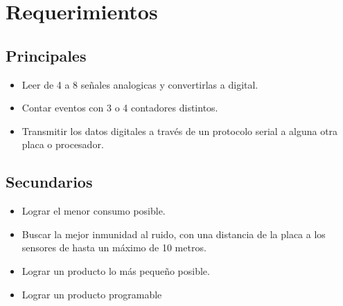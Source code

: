 \section{Requerimientos}
\subsection{Principales}
\begin{itemize}
  \item Leer de 4 a 8 se\~nales analogicas y convertirlas a digital.
  \item Contar eventos con 3 o 4 contadores distintos.
  \item Transmitir los datos digitales a trav\'es de un protocolo serial a alguna otra placa o procesador.
\end{itemize}


\subsection{Secundarios}
\begin{itemize}
  \item Lograr el menor consumo posible.
  \item Buscar la mejor inmunidad al ruido, con una distancia de la placa a los sensores de hasta un m\'aximo de 10 metros.
  \item Lograr un producto lo más peque\~no posible.
  \item Lograr un producto programable
\end{itemize}